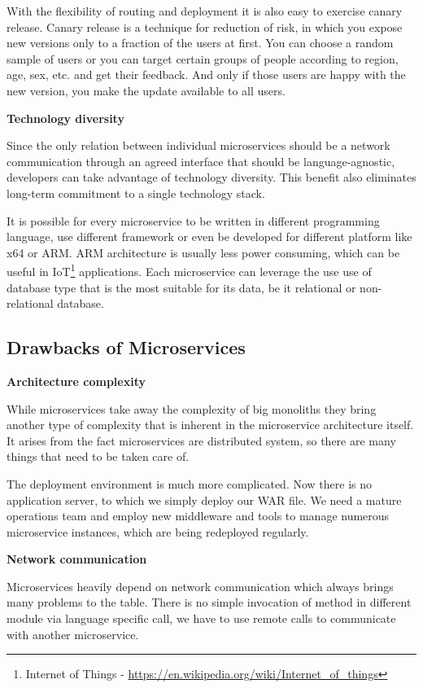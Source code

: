 \documentclass[12pt,oneside]{fithesis2}
\begin{document}
With the flexibility of routing and deployment it is also easy to exercise canary release. Canary release is a technique for reduction of risk, in which you expose new versions only to a fraction of the users at first. You can choose a random sample of users or you can target certain groups of people according to region, age, sex, etc. and get their feedback. And only if those users are happy with the new version, you make the update available to all users.
\bigskip

\noindent\textbf{Technology diversity}
\bigskip

Since the only relation between individual microservices should be a network communication through an agreed interface that should be language-agnostic, developers can take advantage of technology diversity. This benefit also eliminates long-term commitment to a single technology stack.

It is possible for every microservice to be written in different programming language, use different framework or even be developed for different platform like x64 or ARM. ARM architecture is usually less power consuming, which can be useful in IoT\footnote{Internet of Things - \url{https://en.wikipedia.org/wiki/Internet_of_things}} applications. Each microservice can leverage the use use of database type that is the most suitable for its data, be it relational or non-relational database.\newpage

\subsection{Drawbacks of Microservices}
\bigskip

\noindent\textbf{Architecture complexity}
\bigskip

While microservices take away the complexity of big monoliths they bring another type of complexity that is inherent in the microservice architecture itself. It arises from the fact microservices are distributed system, so there are many things that need to be taken care of.

The deployment environment is much more complicated. Now there is no application server, to which we simply deploy our WAR file. We need a mature operations team and employ new middleware and tools to manage numerous microservice instances, which are being redeployed regularly.
\bigskip

\noindent\textbf{Network communication}
\bigskip

Microservices heavily depend on network communication which always brings many problems to the table. There is no simple invocation of method in different module via language specific call, we have to use remote calls to communicate with another microservice.
\end{document}
